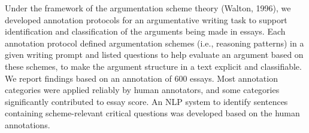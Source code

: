 Under the framework of the argumentation scheme theory (Walton, 1996), we developed annotation protocols for an argumentative writing task to support identification and classification of the arguments being made in essays. Each annotation protocol defined argumentation schemes (i.e., reasoning patterns) in a given writing prompt and listed questions to help evaluate an argument based on these schemes, to make the argument structure in a text explicit and classifiable. We report findings based on an annotation of 600 essays. Most annotation categories were applied reliably by human annotators, and some categories significantly contributed to essay score. An NLP system to identify sentences containing scheme-relevant critical questions was developed based on the human annotations.
